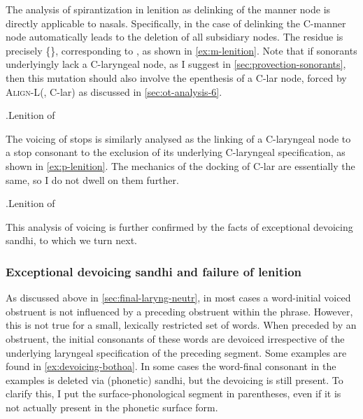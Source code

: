 The analysis of spirantization in lenition as delinking of the manner node is directly applicable to nasals. Specifically, in the case of \ipa{[m]} delinking the C-manner node automatically leads to the deletion of all subsidiary nodes. The residue is precisely \{\}, corresponding to \ipa{[v]}, as shown in \ref{ex:m-lenition}. Note that if sonorants underlyingly lack a C-laryngeal node, as I suggest in \cref{sec:provection-sonorants}, then this mutation should also involve the epenthesis of a C-lar node, forced by \textsc{Align-L}(\sy, C-lar) as discussed in \cref{sec:ot-analysis-6}.

\ex.\setlength\level{12mm}\label{ex:m-lenition}Lenition of \ipa{[m]}\\


The voicing of stops is similarly analysed as the linking of a C-laryngeal node to a stop consonant to the exclusion of its underlying C-laryngeal specification, as shown in \ref{ex:p-lenition}. The mechanics of the docking of C-lar are essentially the same, so I do not dwell on them further.

\ex.\label{ex:p-lenition}Lenition of \ipa{[p]}\\

This analysis of voicing is further confirmed by the facts of exceptional devoicing sandhi, to which we turn next.

\subsubsection{Exceptional devoicing sandhi and failure of lenition}
\label{sec:except-devo-sandhi}


As discussed above in \cref{sec:final-laryng-neutr}, in most cases a word-initial voiced obstruent is not influenced by a preceding obstruent within the phrase. However, this is not true for  a small, lexically restricted set of words. When preceded by an obstruent, the initial consonants of these words are devoiced irrespective of the underlying laryngeal specification of the preceding segment. Some examples are found in \ref{ex:devoicing-bothoa}. In some cases the word-final consonant in the examples is deleted via (phonetic) sandhi, but the devoicing is still present. To clarify this, I put the surface\hyp phonological segment in parentheses, even if it is not actually present in the phonetic surface form.

